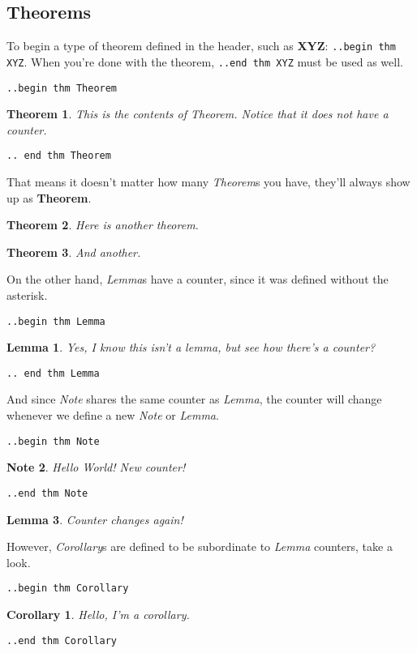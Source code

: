 \documentclass[12pt]{article}
\newtheorem*{Theorem}{Theorem}
\newtheorem{Lemma}{Lemma}
\newtheorem{Corollary}{Corollary}[Lemma]
\newtheorem{Note}[Lemma]{Note}
\begin{document}
\begin{flushleft}
\newpage

\section*{Theorems}

\bigskip

To begin a type of theorem defined in the header, such as \textbf{XYZ}: \verb|..begin thm XYZ|. When you're done with the theorem, \verb|..end thm XYZ| must be used as well.

\medskip

\verb|..begin thm Theorem|
\begin{Theorem}
This is the contents of Theorem. Notice that it does not have a counter.
\end{Theorem}
\verb|.. end thm Theorem|

\medskip

That means it doesn't matter how many \emph{Theorem}s you have, they'll always show up as \textbf{Theorem}.

\begin{Theorem}
Here is another theorem.
\end{Theorem}

\begin{Theorem}
And another.
\end{Theorem}

On the other hand, \emph{Lemma}s have a counter, since it was defined without the asterisk.

\medskip
\verb|..begin thm Lemma|
\begin{Lemma}
Yes, I know this isn't a lemma, but see how there's a counter?
\end{Lemma}
\verb|.. end thm Lemma|
\medskip

And since \emph{Note} shares the same counter as \emph{Lemma}, the counter will change whenever we define
a new \emph{Note} or \emph{Lemma}.

\medskip
\verb|..begin thm Note|
\begin{Note}
Hello World! New counter!
\end{Note}
\verb|..end thm Note|
\medskip

\begin{Lemma}
Counter changes again!
\end{Lemma}

However, \emph{Corollary}s are defined to be subordinate to \emph{Lemma} counters, take a look.

\medskip
\verb|..begin thm Corollary|
\begin{Corollary}
Hello, I'm a corollary.
\end{Corollary}
\verb|..end thm Corollary|
\medskip


\end{flushleft}
\end{document}
